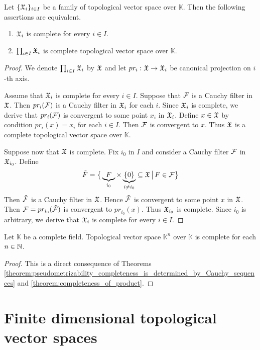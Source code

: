 \begin{theorem}\label{theorem:completeness_of_product}
Let $\{{\mathfrak X}_i\}_{i \in I}$ be a family of topological vector space over $\mathbb{K}$. Then the following assertions are equivalent.
\begin{enumerate}[label=\emph{\textbf{(\roman*)}}, leftmargin=*]
\item ${\mathfrak X}_i$ is complete for every $i \in I$.
\item $\prod_{i \in I}{\mathfrak X}_i$ is complete topological vector space over $\mathbb{K}$.
\end{enumerate}
\end{theorem}
\begin{proof}
We denote $\prod_{i\in I}{\mathfrak X}_i$ by ${\mathfrak X}$ and let $pr_i:{\mathfrak X} \rightarrow {\mathfrak X}_i$ be canonical projection on $i$-th axis.

Assume that ${\mathfrak X}_i$ is complete for every $i \in I$. Suppose that ${\mathcal F}$ is a Cauchy filter in ${\mathfrak X}$. Then $pr_i({\mathcal F})$ is a Cauchy filter in ${\mathfrak X}_i$ for each $i$. Since ${\mathfrak X}_i$ is complete, we derive that $pr_i({\mathcal F})$ is convergent to some point $x_i$ in ${\mathfrak X}_i$. Define $x \in {\mathfrak X}$ by condition $pr_i(x) = x_i$ for each $i \in I$. Then ${\mathcal F}$ is convergent to $x$. Thus ${\mathfrak X}$ is a complete topological vector space over $\mathbb{K}$.

Suppose now that ${\mathfrak X}$ is complete. Fix $i_0$ in $I$ and consider a Cauchy filter ${\mathcal F}$ in ${\mathfrak X}_{i_0}$. Define
$$\tilde{F} = \big\{\underbrace{F}_{i_0} \times \underbrace{\{0\}}_{i\neq i_0} \subseteq {\mathfrak X}\,\big|\,F\in {\mathcal F}\big\}$$
Then $\tilde{{\mathcal F}}$ is a Cauchy filter in ${\mathfrak X}$. Hence $\tilde{{\mathcal F}}$ is convergent to some point $x$ in ${\mathfrak X}$. Then ${\mathcal F} = pr_{i_0}(\tilde{{\mathcal F}})$ is convergent to $pr_{i_0}(x)$. Thus ${\mathfrak X}_{i_0}$ is complete. Since $i_0$ is arbitrary, we derive that ${\mathfrak X}_i$ is complete for every $i\in I$.
\end{proof}

\begin{corollary}\label{corollary:finite_products_of_copies_of_field_are_complete}
Let $\mathbb{K}$ be a complete field. Topological vector space $\mathbb{K}^n$ over $\mathbb{K}$ is complete for each $n\in {\mathbb N}$.
\end{corollary}
\begin{proof}
This is a direct consequence of Theorems \ref{theorem:pseudometrizability_completeness_is_determined_by_Cauchy_sequences} and \ref{theorem:completeness_of_product}.
\end{proof}

\section{Finite dimensional topological vector spaces}

